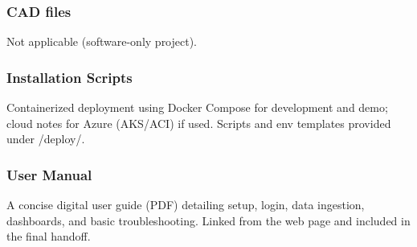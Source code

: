 \subsubsection{CAD files}
Not applicable (software-only project).

\subsubsection{Installation Scripts}
Containerized deployment using Docker Compose for development and demo; cloud notes for Azure
(AKS/ACI) if used. Scripts and env templates provided under /deploy/.

\subsubsection{User Manual}
A concise digital user guide (PDF) detailing setup, login, data ingestion, dashboards, and basic
troubleshooting. Linked from the web page and included in the final handoff.